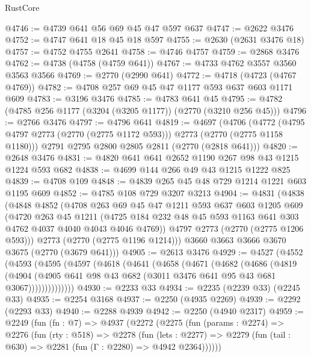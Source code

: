 \begin{lexlean}{RustCore}
\begin{coremodule}
@4746 := @4739 @641 @56 @69 @45 @47 @597 @637
@4747 := @2622 @3476
@4752 := @4747 @641 @18 @45 @18 @597
@4755 := @2630 (@2631 @3476 @18)
@4757 := @4752 @4755 @2641
@4758 := @4746 @4757
@4759 := @2868 @3476
@4762 := @4738 (@4758 (@4759 @641))
@4767 := @4733 @4762 @3557 @3560 @3563 @3566
@4769 := @2770 (@2990 @641)
@4772 := @4718 (@4723 (@4767 @4769))
@4782 := @4708 @257 @69 @45 @47 @1177 @593 @637 @603 @1171 @609
@4783 := @3196 @3476
@4785 := @4783 @641 @45
@4795 := @4782 (@4785 @256 @1177 (@3204 (@3205 @1177)) (@2770 (@3210 @256 @45)))
@4796 := @2766 @3476
@4797 := @4796 @641
@4819 := @4697
    (@4706
      (@4772 (@4795 @4797 @2773 (@2770 (@2775 @1172 @593))) @2773 (@2770 (@2775 @1158 @1180)))
      @2791
      @2795
      @2800
      @2805
      @2811
      (@2770 (@2818 @641)))
@4820 := @2648 @3476
@4831 := @4820 @641 @641 @2652 @1190 @267 @98 @43 @1215 @1224 @593 @682
@4838 := @4699 @144 @266 @49 @43 @1215 @1222 @825
@4839 := @4708 @109
@4848 := @4839 @265 @45 @48 @729 @1214 @1221 @603 @1195 @609
@4852 := @4785 @108 @729 @3207 @3213
@4904 := @4831
    (@4838
      (@4848
        @4852
        (@4708
          @263
          @69
          @45
          @47
          @1211
          @593
          @637
          @603
          @1205
          @609
          (@4720
            @263
            @45
            @1211
            (@4725 @184 @232 @48 @45 @593 @1163 @641 @303 @4762 @4037 @4040 @4043 @4046 @4769))
          @4797
          @2773
          (@2770 (@2775 @1206 @593)))
        @2773
        (@2770 (@2775 @1196 @1214)))
      @3660
      @3663
      @3666
      @3670
      @3675
      (@2770 (@3679 @641)))
@4905 := @2613 @3476
@4929 := @4527
    (@4552
      (@4593
        (@4595
          (@4597
            (@4618
              (@4641
                (@4658
                  (@4671
                    (@4682
                      (@4686
                        (@4819
                          (@4904
                            (@4905
                              @641
                              @98
                              @43
                              @682
                              (@3011 @3476 @641 @95 @43 @681 @3067))))))))))))))
@4930 := @2233 @33
@4934 := @2235 (@2239 @33) (@2245 @33)
@4935 := @2254 @3168
@4937 := @2250 (@4935 @2269)
@4939 := @2292 (@2293 @33)
@4940 := @2288 @4939
@4942 := @2250 (@4940 @2317)
@4959 := @2249
    (fun (fn : @7) =>
    @4937
      (@2272
        (@2275
          (fun (params : @2274) =>
          @2276
            (fun (rty : @518) =>
            @2278
              (fun (lets : @2277) =>
              @2279 (fun (tail : @630) => @2281 (fun (Γ : @2280) => @4942 @2364))))))

\end{coremodule}
\end{lexlean}
